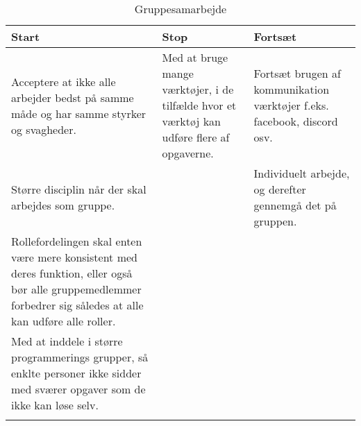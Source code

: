 \setlength{\LTleft}{-20cm plus -1fill}
\setlength{\LTright}{\LTleft}
\begin{longtable}{| p{} | p{} | p{} |}
\hline
\textbf{Start}                                                                                                                                                 & \textbf{Stop}                                                                              & \textbf{Fortsæt}                                                        \\ \hline
Acceptere at ikke alle arbejder bedst på samme måde og har samme styrker og svagheder.                                                                         & Med at bruge mange værktøjer, i de tilfælde hvor et værktøj kan udføre flere af opgaverne. & Fortsæt brugen af kommunikation værktøjer f.eks. facebook, discord osv. \\ \hline
Større disciplin når der skal arbejdes som gruppe.                                                                                                             &                                                                                            & Individuelt arbejde, og derefter gennemgå det på gruppen.               \\ \hline
Rollefordelingen skal enten være mere konsistent med deres funktion, eller også bør alle gruppemedlemmer forbedrer sig således at alle kan udføre alle roller. &                                                                                            &                                                                         \\ \hline
Med at inddele i større programmerings grupper, så enklte personer ikke sidder med sværer opgaver som de ikke kan løse selv.                                   &                                                                                            &                                                                         \\ \hline
\caption{Gruppesamarbejde}\label{GruppesamarbejdeSSF}
\end{longtable}

